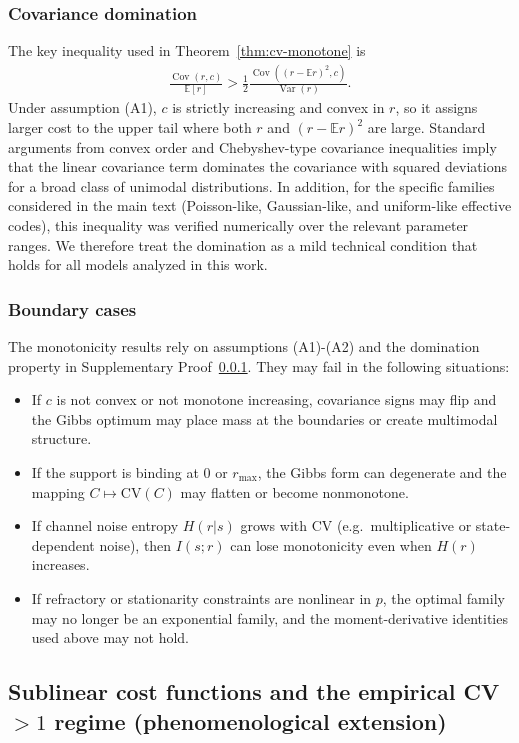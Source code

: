 \documentclass[11pt]{article}
\DeclareMathOperator{\Var}{Var}
\DeclareMathOperator{\Cov}{Cov}
\newcommand{\EE}{\mathbb{E}}
\theoremstyle{remark}
\theoremstyle{definition}
\begin{document}
\subsubsection{Covariance domination}
\label{proof:cov-dominate}
The key inequality used in Theorem~\ref{thm:cv-monotone} is
\begin{align}
\frac{\Cov(r,c)}{\EE[r]} > \tfrac{1}{2}\frac{\Cov((r-\EE r)^2,c)}{\Var(r)}.
\end{align}
Under assumption (A1), $c$ is strictly increasing and convex in $r$, so it assigns larger cost to the upper tail where both $r$ and $(r-\EE r)^2$ are large.  
Standard arguments from convex order and Chebyshev-type covariance inequalities imply that the linear covariance term dominates the covariance with squared deviations for a broad class of unimodal distributions.  
In addition, for the specific families considered in the main text (Poisson-like, Gaussian-like, and uniform-like effective codes), this inequality was verified numerically over the relevant parameter ranges.  
We therefore treat the domination as a mild technical condition that holds for all models analyzed in this work.

\subsubsection{Boundary cases}
The monotonicity results rely on assumptions (A1)-(A2) and the domination property in Supplementary Proof~\ref{proof:cov-dominate}.  
They may fail in the following situations:
\begin{itemize}
\item If $c$ is not convex or not monotone increasing, covariance signs may flip and the Gibbs optimum may place mass at the boundaries or create multimodal structure.
\item If the support is binding at $0$ or $r_{\max}$, the Gibbs form can degenerate and the mapping $C\mapsto \mathrm{CV}(C)$ may flatten or become nonmonotone.
\item If channel noise entropy $H(r|s)$ grows with $\mathrm{CV}$ (e.g.\ multiplicative or state-dependent noise), then $I(s;r)$ can lose monotonicity even when $H(r)$ increases.
\item If refractory or stationarity constraints are nonlinear in $p$, the optimal family may no longer be an exponential family, and the moment-derivative identities used above may not hold.
\end{itemize}


\subsection{Sublinear cost functions and the empirical CV $>1$ regime (phenomenological extension)}
\label{sec:sublinear-cost}
\end{document}
